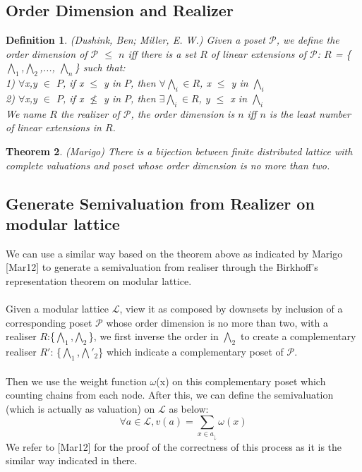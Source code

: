 \documentclass{article}
\newtheorem{theorem}{\bf Theorem}
\newtheorem{definition}[theorem]{\bf Definition}
\begin{document}
\subsection{Order Dimension and Realizer}
\begin{definition}
(Dushink, Ben; Miller, E. W.) Given a poset $\mathcal{P}$, we define the order dimension of $\mathcal{P}$ $\leq$ $n$ iff there is a set $R$ of linear extensions of $\mathcal{P}$:  $R$ = \{ $\bigwedge_{1}$,$\bigwedge_{2}$,..., $\bigwedge_{n}$\} such that:\\

1) $\forall$x,y $\in$ $P$, if x $\leq$ y in $P$, then $\forall$$\bigwedge_{i}$$\in$$R$, x $\leq$ y in $\bigwedge_{i}$ \\

2) $\forall$x,y $\in$ $P$, if x $\nleq$ y in $P$, then $\exists$$\bigwedge_{i}$$\in$$R$, y $\leq$ x in $\bigwedge_{i}$\\

We name $R$ the realizer of $\mathcal{P}$, the order dimension is $n$ iff $n$ is the least number of linear extensions in $R$. 

\end{definition}

\begin{theorem}
(Marigo) There is a bijection between finite distributed lattice with complete valuations and poset whose order dimension is no more than two. 
\end{theorem}

\subsection{Generate Semivaluation from Realizer on modular lattice}

We can use a similar way based on the theorem above as indicated by Marigo [Mar12] to generate a semivaluation from realiser through the Birkhoff's representation theorem on modular lattice.\\\\
Given a modular lattice $\mathcal{L}$, view it as composed by downsets by inclusion of a corresponding poset $\mathcal{P}$ whose order dimension is no more than two, with a realiser $R$:\{$\bigwedge_{1}$,$\bigwedge_{2}$\}, we first inverse the order in $\bigwedge_{2}$ to create a complementary realiser $R'$: \{$\bigwedge_{1}$,$\bigwedge'_{2}$\} which indicate a complementary poset of $\mathcal{P}$. \\\\
Then we use the weight function $\omega$(x) on this complementary poset which counting chains from each node. After this, we can define the semivaluation (which is actually as valuation) on $\mathcal{L}$ as below: $$ \forall a \in \mathcal{L}, v(a)=\sum_{x \in a_{\downarrow}} \omega(x)  $$ We refer to [Mar12] for the proof of the correctness of this process as it is the similar way indicated in there.
\end{document}
